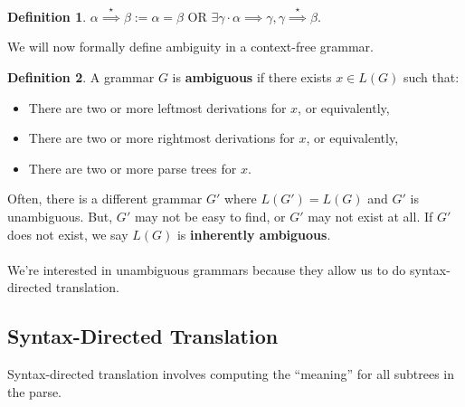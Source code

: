 \documentclass[]{article}
\theoremstyle{definition}
\newtheorem*{defn}{Definition}
\begin{document}
			\begin{defn}
				$\alpha \stackrel{\star}{\implies} \beta := \alpha = \beta \text{ OR } \exists \gamma \cdot \alpha \implies \gamma, \gamma \stackrel{\star}{\implies} \beta$.
			\end{defn}

			We will now formally define ambiguity in a context-free grammar.

			\begin{defn}
				A grammar $G$ is \textbf{ambiguous} if there exists $x \in L(G)$ such that:
				\begin{itemize}
					\item There are two or more leftmost derivations for $x$, or equivalently,
					\item There are two or more rightmost derivations for $x$, or equivalently,
					\item There are two or more parse trees for $x$.
				\end{itemize}
			\end{defn}

			Often, there is a different grammar $G'$ where $L(G') = L(G)$ and $G'$ is unambiguous. But, $G'$ may not be easy to find, or $G'$ may not exist at all. If $G'$ does not exist, we say $L(G)$ is \textbf{inherently ambiguous}.
			\\ \\
			We're interested in unambiguous grammars because they allow us to do syntax-directed translation.
		\subsection{Syntax-Directed Translation}
			Syntax-directed translation involves computing the ``meaning'' for all subtrees in the parse.
\end{document}
